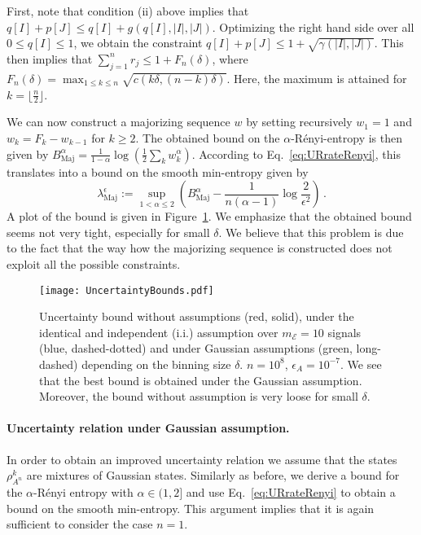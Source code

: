 \documentclass[aps,amsfonts,twoside,amssymb,superscriptaddress,twocolumn]{revtex4-1}
\newcommand*{\cE}{\mathcal{E}}
\newcommand*{\maj}{\textrm{Maj}}
\begin{document}
First, note that condition (ii) above implies that $ q[I]+p[J] \leq q[I] + g(q[I],|I|,|J|)$. Optimizing the right hand side over all $0\leq q[I] \leq 1$, we obtain the constraint $q[I]+p[J] \leq 1+ \sqrt{\gamma(|I|,|J|)} $. This then implies that $\sum_{j=1}^n r_j \leq  1 + F_n(\delta)$, where $ F_n(\delta) = \max_{1\leq k\leq n} \sqrt{c\left(k\delta,(n-k) \delta\right)}$. Here, the maximum is attained for $k=\lfloor \frac n 2 \rfloor$.

We can now construct a majorizing sequence $w$ by setting recursively $ w_1=1$ and $ w_k = F_k - w_{k-1}$ for $k\geq 2$. The obtained bound on the $\alpha$-R{\'e}nyi-entropy is then given by $B^\alpha_{\text{Maj}} = \frac{1}{1-\alpha} \log \left( \frac 12 \sum_k w_k^\alpha\right)  $. 
According to Eq.~\eqref{eq:URrateRenyi}, this translates into a bound on the smooth min-entropy given by
\begin{equation}
 \lambda_\maj^\epsilon := \sup_{1< \alpha\leq 2} \left( B^\alpha_{\text{Maj}} - \frac{1}{n(\alpha-1)} \log\frac{2}{\epsilon^2} \right)  \, .
\end{equation}
A plot of the bound is given in Figure~\ref{fig:UR}. We emphasize that the obtained bound seems not very tight, especially for small $\delta$. We believe that this problem is due to the fact that the way how the majorizing sequence is constructed does not exploit all the possible constraints.  


\begin{figure}
    \begin{center}
        \texttt{[image: UncertaintyBounds.pdf]}
        \caption{ 
            Uncertainty bound without assumptions (red, solid), under the identical and independent (i.i.) assumption over $m_\cE=10$ signals (blue, dashed-dotted) and under Gaussian assumptions (green, long-dashed)  depending on the binning size $\delta$. $n=10^8$, $\epsilon_A=10^{-7}$. We see that the best bound is obtained under the Gaussian assumption. Moreover, the bound without assumption is very loose for small $\delta$.   
}
        \label{fig:UR}
    \end{center}
\end{figure}


\paragraph{Uncertainty relation under Gaussian assumption.}
In order to obtain an improved uncertainty relation we assume that the states $\rho_{A^n}^k$ are mixtures of Gaussian states. Similarly as before, we derive a bound for the $\alpha$-R{\'e}nyi entropy with $\alpha\in (1,2]$ and use Eq.~\eqref{eq:URrateRenyi} to obtain a bound on the smooth min-entropy. This argument implies that it is again sufficient to consider the case $n=1$. 
\end{document}
